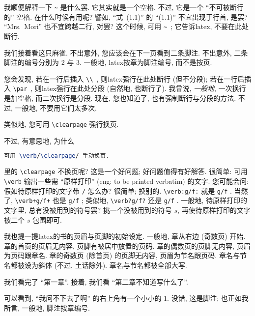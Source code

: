 我顺便解释一下 \verb`~` 是什么罢.
它其实就是一个空格.
不过, 它是一个 ``不可被断行的'' 空格.
在什么时候有用呢?
譬如, ``式~(1.1)'' 的 ``(1.1)'' 不宜出现于行首, 是罢?
``Mrs.~Mori'' 也不宜跨越二行, 对罢?
这个时候, 可用 \verb`~`~;
它告诉\gls{latex}, 不要在此处断行.

我们接着看这只麻雀.
不出意外, 您应该会在下一页看到二条脚注.
不出意外, 二条脚注的编号分别为 2 与 3.
一般地, \gls{latex}按章为脚注编号, 而不是按页.

您会发现, 若在一行后插入 \verb`\\`~,
则\gls{latex}强行在此处断行 (但不分段);
若在一行后插入 \verb`\par`~,
则\gls{latex}强行在此处分段 (自然地, 也断行了).
我曾说,
\emph{一般地}, 一次换行是加空格, 而二次换行是分段.
现在, 您也知道了, 也有强制断行与分段的方法.
不过, 一般地, 不要用它们太多次.

类似地, 您可用 \verb`\clearpage` 强行换页.

不过, 有意思地, 为什么
\begin{lstlisting}[language=TeX]
可用 \verb/\clearpage/ 手动换页.
\end{lstlisting}
里的 \verb`\clearpage` 不换页呢?
这是一个好问题; 好问题值得有好解答.
很简单: 可用 \verb`\verb` 输出一些需
``原样打印'' (\gls{eng}: to be printed verbatim) 的文字.
您可能会问: 假如待原样打印的文字带 \verb`/` 怎么办?
很简单; 换别的.
\verb`\verb:g/f:` 就是 \verb:g/f: .
当然了, \verb`\verb+g/f+` 也是 \verb+g/f+ ;
类似地, \verb`\verb?g/f?` 还是 \verb?g/f? .
一般地, 待原样打印的文字里, 总有没被用到的符号罢?
挑一个没被用到的符号 $s$,
再使待原样打印的文字被二个 $s$ 包围即可.

我也提一提\gls{latex}的书的页眉与页脚的初始设定.
一般地, 章从右边 (奇数页) 开始.
章的首页的页眉无内容, 页脚有被居中放置的页码.
章的偶数页的页脚无内容, 页眉为页码跟章名.
章的奇数页 (除首页) 的页脚无内容, 页眉为节名跟页码.
章名与节名都被设为斜体 (不过, 土话除外).
章名与节名都被全部大写.

我们看完了 ``第一章''.
接着, 我们看 ``第二章\quad 不知道写什么了''.

可以看到,
``我问不下去了啊'' 的右上角有一个小小的 1.
没错, 这是脚注;
也正如我所言, 一般地, 脚注按章编号.

